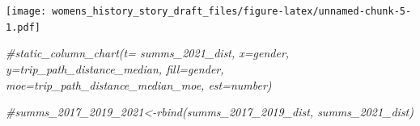 \documentclass[
  12pt,
]{article}
\newenvironment{Shaded}{\begin{snugshade}}{\end{snugshade}}
\newcommand{\CommentTok}[1]{\textcolor[rgb]{0.56,0.35,0.01}{\textit{#1}}}
\begin{document}
\texttt{[image: womens\_history\_story\_draft\_files/figure-latex/unnamed-chunk-5-1.pdf]}

\begin{Shaded}
\begin{Highlighting}[]
\CommentTok{\#static\_column\_chart(t= summs\_2021\_dist, x=\textquotesingle{}gender\textquotesingle{}, y=\textquotesingle{}trip\_path\_distance\_median\textquotesingle{},  fill=\textquotesingle{}gender\textquotesingle{}, moe=\textquotesingle{}trip\_path\_distance\_median\_moe\textquotesingle{}, est=\textquotesingle{}number\textquotesingle{})}

  
\CommentTok{\#summs\_2017\_2019\_2021\textless{}{-}rbind(summs\_2017\_2019\_dist, summs\_2021\_dist)}
\end{Highlighting}
\end{Shaded}
\end{document}

